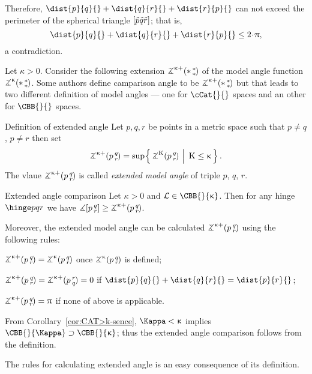 Therefore, 
$\dist{p}{q}{}+\dist{q}{r}{}+\dist{r}{p}{}$ can not exceed the perimeter of the  spherical triangle $[{\tilde p}{\tilde q}{\tilde r}]$; 
that is,
\[\dist{p}{q}{}+\dist{q}{r}{}+\dist{r}{p}{}\le 2\cdot\pi,\]
a contradiction.
\qeds


Let $\kappa>0$.
Consider the following extension $\angk{\kappa+}{{*}}{{*}}{{*}}$ 
of the model angle function $\angk\kappa{{*}}{{*}}{{*}}$.
Some authors define camparison angle to be $\angk{\kappa+}{{*}}{{*}}{{*}}$ but
that leads to two different definition of model angles --- one for $\cCat{}{}$ spaces and an other for $\CBB{}{}$ spaces.

\begin{thm}{Definition of extended angle}
Let $p,q,r$ be points in a metric space such that  $p\not=q$, $p\not=r$ then
set
\[\angk{\kappa+} p q r=\sup\set{\angk{\Kappa} p q r}{\Kappa\le\kappa}.\]
The vlaue $\angk{\kappa+} p q r$ is called \emph{extended model angle} of triple $p$, $q$, $r$.
\end{thm}

\begin{thm}{Extended angle comparison}
Let $\kappa>0$ 
and $\spc{L}\in\CBB{}{\kappa}$. 
Then for any hinge 
$\hinge p q r$ we have 
$\mangle\hinge p q r
\ge\angk{\kappa+} p q r$.

Moreover, the extended model angle can be calculated $\angk{\kappa+} p q r$ using the following rules:

\begin{subthm}{} $\angk{\kappa+} p q r=\angk{\kappa} p q r$ once $\angk{\kappa} p q r$ is defined;
\end{subthm}

\begin{subthm}{} $\angk{\kappa+} p q r=\angk{\kappa+} p r q=0$ if $\dist{p}{q}{}+\dist{q}{r}{}=\dist{p}{r}{}$;
\end{subthm}

\begin{subthm}{} $\angk{\kappa+} p q r=\pi$ if none of above is applicable. 
\end{subthm}
\end{thm}

From Corollary~\ref{cor:CAT>k-sence}, $\Kappa<\kappa$ implies $\CBB{}{\Kappa}\supset \CBB{}{\kappa}$; 
thus the extended angle comparison follows from the definition.

The rules for calculating extended angle is an easy consequence of its definition.
\qeds


